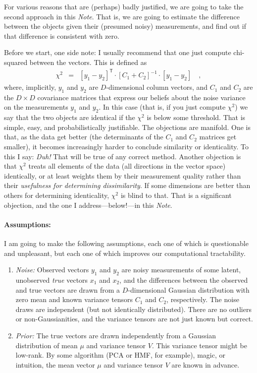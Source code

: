 \documentclass[12pt,letterpaper]{article}
\newcommand{\documentname}{\textsl{Note}}
\newcommand{\transpose}[1]{{#1}^{\mathsf{T}}}
\newcommand{\inverse}[1]{{#1}^{-1}}
\begin{document}
For various reasons that are (perhaps) badly justified, we are going
to take the second approach in this \documentname. That is, we are
going to estimate the difference between the objects given their
(presumed noisy) measurements, and find out if that difference is
consistent with zero.

Before we start, one side note: I usually recommend that one just
compute chi-squared between the vectors. This is defined as
\begin{eqnarray}
\chi^2 &=&
\transpose{[y_1 - y_2]}\cdot\inverse{[C_1 + C_2]}\cdot [y_1 - y_2] \quad ,
\end{eqnarray}
where, implicitly, $y_1$ and $y_2$ are $D$-dimensional column vectors,
and $C_1$ and $C_2$ are the $D\times D$ covariance matrices that
express our beliefs about the noise variance on the measurements $y_1$
and $y_2$. In this case (that is, if you just compute $\chi^2$) we say
that the two objects are identical if the $\chi^2$ is below some
threshold. That is simple, easy, and probabilistically
justifiable. The objections are manifold. One is that, as the data get
better (the determinants of the $C_1$ and $C_2$ matrices get smaller),
it becomes increasingly harder to conclude similarity or
identicality. To this I say: \emph{Duh!} That will be true of any
correct method. Another objection is that $\chi^2$ treats all elements
of the data (all directions in the vector space) identically, or at
least weights them by their measurement quality rather than their
\emph{usefulness for determining dissimilarity}. If some dimensions
are better than others for determining identicality, $\chi^2$ is blind
to that. That is a significant objection, and the one I
address---below!---in this \documentname.

\paragraph{Assumptions:}
I am going to make the following assumptions, each one of which is
questionable and unpleasant, but each one of which improves our
computational tractability.
\begin{enumerate}\itemsep0ex
\item \emph{Noise:} Observed vectors $y_1$ and $y_2$ are noisy
  measurements of some latent, unobserved \emph{true} vectors $x_1$
  and $x_2$, and the differences between the observed and true vectors
  are drawn from a $D$-dimensional Gaussian distribution with zero
  mean and known variance tensors $C_1$ and $C_2$, respectively. The
  noise draws are independent (but not identically distributed). There
  are no outliers or non-Gaussianities, and the variance tensors are
  not just known but correct.
\item \emph{Prior:} The true vectors are drawn independently from a
  Gaussian distribution of mean $\mu$ and variance tensor $V$. This
  variance tensor might be low-rank. By some algorithm (PCA or HMF,
  for example), magic, or intuition, the mean vector $\mu$ and
  variance tensor $V$ are known in advance.
\end{enumerate}
\end{document}
